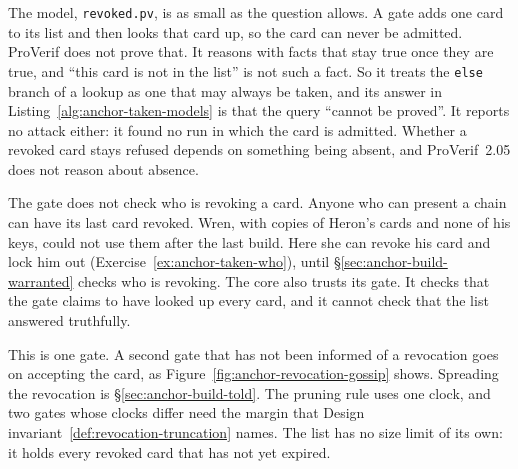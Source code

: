 The model, \texttt{revoked.pv}, is as small as the question allows. A
gate adds one card to its list and then looks that card up, so the card can
never be admitted. ProVerif does not prove that. It reasons with facts that
stay true once they are true, and ``this card is not in the list'' is
not such a fact. So it treats the \texttt{else} branch of a lookup as one
that may always be taken, and its answer in
Listing~\ref{alg:anchor-taken-models} is that the query ``cannot be
proved''. It reports no attack either: it found no run in which the card
is admitted.
Whether a revoked card stays refused depends on something being
absent, and ProVerif~2.05 does not reason about absence.

\begin{pdboundary}
\setlength{\parskip}{4pt plus 1pt}
The gate does not check who is revoking a card. Anyone who can present a
chain can have its last card revoked. Wren, with copies of Heron's
cards and none of his keys, could not use them after the last build. Here
she can revoke his card and lock him out
(Exercise~\ref{ex:anchor-taken-who}), until
\S\ref{sec:anchor-build-warranted} checks who is revoking. The core also
trusts its gate. It
checks that the gate claims to have looked up every card, and it cannot
check that the list answered truthfully.

This is one gate. A second gate that has not been informed of a revocation
goes on accepting the card, as Figure~\ref{fig:anchor-revocation-gossip}
shows. Spreading the revocation is \S\ref{sec:anchor-build-told}. The
pruning rule uses one clock, and two gates whose clocks differ need the
margin that Design invariant~\ref{def:revocation-truncation} names. The
list has no size limit of its own: it holds every revoked card that has not
yet expired.
\end{pdboundary}
